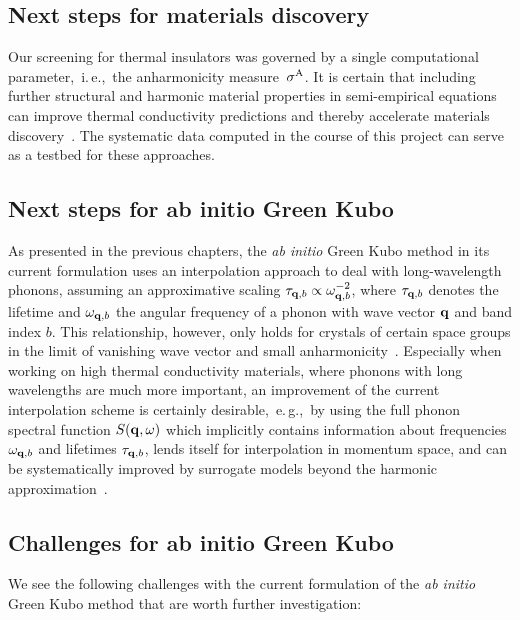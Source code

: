 
\subsection{Next steps for materials discovery}
Our screening for thermal insulators was governed by a single computational parameter,~i.\,e.,~the anharmonicity measure~$\sigma^\mathrm{A}$. It is certain that including further structural and harmonic material properties in semi-empirical equations can improve thermal conductivity predictions and thereby accelerate materials discovery~\cite{ouyang2018,goldsmith2017,Chen2019,Purcell2021}. The systematic data computed in the course of this project can serve as a testbed for these approaches.

\subsection{Next steps for ab initio Green Kubo}
As presented in the previous chapters, the \emph{ab initio} Green Kubo method in its current formulation uses an interpolation approach to deal with long-wavelength phonons, assuming an approximative scaling $\tau_{{\bf q}, b} \propto \omega^{-2}_{{\bf q}, b}$, where $\tau_{{\bf q}, b}$ denotes the lifetime and $\omega_{{\bf q}, b}$ the angular frequency of a phonon with wave vector ${\bf q}$ and band index $b$. This relationship, however, only holds for crystals of certain space groups in the limit of vanishing wave vector and small anharmonicity~\cite{Herring1954}. Especially when working on high thermal conductivity materials, where phonons with long wavelengths are much more important, an improvement of the current interpolation scheme is certainly desirable,~e.\,g.,~by using the full phonon spectral function $S({\bf q}, \omega)$ which implicitly contains information about frequencies $\omega_{{\bf q}, b}$ and lifetimes $\tau_{{\bf q}, b}$, lends itself for interpolation in momentum space, and can be systematically improved by surrogate models beyond the harmonic approximation~\cite{Maradudin1962}.


\subsection{Challenges for ab initio Green Kubo}
We see the following challenges with the current formulation of the \emph{ab initio} Green Kubo method that are worth further investigation: 

